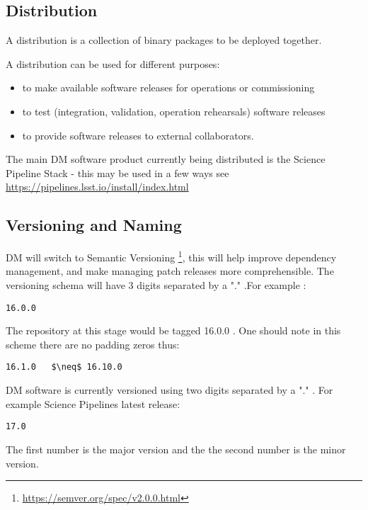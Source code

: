 \subsection{Distribution} \label{sec:distribution}

A distribution is a collection of binary packages to be deployed together.

A distribution can be used for different purposes:

\begin{itemize}
\item to make available software releases for operations or commissioning
\item to test (integration, validation, operation rehearsals) software releases
\item to provide software releases to external collaborators.
\end{itemize}

The main DM software product currently being distributed is the Science Pipeline Stack -
this may be used in a few ways see \url{https://pipelines.lsst.io/install/index.html}


\newpage
\subsection{Versioning and Naming} \label{sec:versioning}
DM will  switch to Semantic Versioning \footnote{\url{https://semver.org/spec/v2.0.0.html}},  this will help improve dependency management, and make  managing patch releases more comprehensible.
The versioning schema will have 3 digits separated by a "." .For example :

\begin{verbatim}
16.0.0
\end{verbatim}

The repository at this stage would be tagged 16.0.0 .
One should note in this scheme there are no padding zeros thus:
\begin{verbatim}
16.1.0   $\neq$ 16.10.0
\end{verbatim}

DM software is currently versioned using two digits separated by a "." .
For example Science Pipelines latest release:

\begin{verbatim}
17.0
\end{verbatim}
The first number is the major version and the the second number is the minor version.




